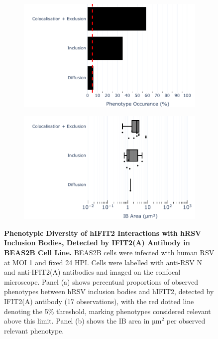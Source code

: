 \begin{figure}
    \begin{subfigure}{0.495\textwidth}
        \caption{}
        \includegraphics[width=1\linewidth]{08. Chapter 3/Figs/02. Infection/02. IFIT2/01. IFIT2A/10. bar_i2a_beas2b.pdf} 
    \end{subfigure}
    \begin{subfigure}{0.495\textwidth}
        \caption{}
        \includegraphics[width=1\linewidth]{08. Chapter 3/Figs/02. Infection/02. IFIT2/01. IFIT2A/11. box_i2a_beas2b.pdf}
    \end{subfigure}
    \caption[Phenotypic Diversity of hIFIT2 Interactions with hRSV Inclusion Bodies, Detected by IFIT2(A) Antibody in BEAS2B Cell Line.]{\textbf{Phenotypic Diversity of hIFIT2 Interactions with hRSV Inclusion Bodies, Detected by IFIT2(A) Antibody in BEAS2B Cell Line.} BEAS2B cells were infected with human RSV at MOI 1 and fixed 24 HPI. Cells were labelled with anti-RSV N and anti-IFIT2(A) antibodies and imaged on the confocal microscope. Panel (a) shows percentual proportions of observed phenotypes between hRSV inclusion bodies and hIFIT2, detected by IFIT2(A) antibody (17 observations), with the red dotted line denoting the 5\% threshold, marking phenotypes considered relevant above this limit. Panel (b) shows the IB area in \(\mbox{µm}^2\) per observed relevant phenotype.}
    \label{fig:Phenotypic Diversity of hIFIT2 Interactions with hRSV Inclusion Bodies, Detected by IFIT2(A) Antibody in BEAS2B Cell Line}
\end{figure}

